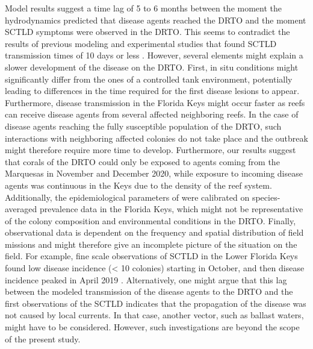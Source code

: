 Model results suggest a time lag of 5 to 6 months between the moment the hydrodynamics predicted that disease agents reached the DRTO and the moment SCTLD symptoms were observed in the DRTO. This seems to contradict the results of previous modeling and experimental studies that found SCTLD transmission times of 10 days or less \citep{dobbelaere2020coupled, meiling2021variable}. However, several elements might explain a slower development of the disease on the DRTO. First, in situ conditions might significantly differ from the ones of a controlled tank environment, potentially leading to differences in the time required for the first disease lesions to appear. Furthermore, disease transmission in the Florida Keys might occur faster as reefs can receive disease agents from several affected neighboring reefs. In the case of disease agents reaching the fully susceptible population of the DRTO, such interactions with neighboring affected colonies do not take place and the outbreak might therefore require more time to develop. Furthermore, our results suggest that corals of the DRTO could only be exposed to agents coming from the Marquesas in November and December 2020, while exposure to incoming disease agents was continuous in the Keys due to the density of the reef system. Additionally, the epidemiological parameters of \cite{dobbelaere2020coupled} were calibrated on species-averaged prevalence data in the Florida Keys, which might not be representative of the colony composition and environmental conditions in the DRTO. Finally, observational data is dependent on the frequency and spatial distribution of field missions and might therefore give an incomplete picture of the situation on the field. For example, fine scale observations of SCTLD in the Lower Florida Keys found low disease incidence (< 10 colonies) starting in October, and then disease incidence peaked in April 2019 \citep{williams2021fine}. Alternatively, one might argue that this lag between the modeled transmission of the disease agents to the DRTO and the first observations of the SCTLD indicates that the propagation of the disease was not caused by local currents. In that case, another vector, such as ballast waters, might have to be considered. However, such investigations are beyond the scope of the present study.

